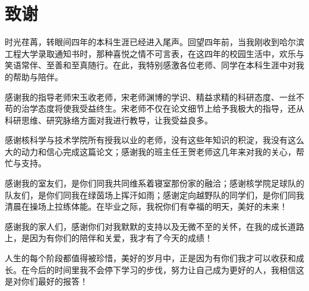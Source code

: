 \section*{致谢}
时光荏苒，转眼间四年的本科生涯已经进入尾声。回望四年前，当我刚收到哈尔滨工程大学录取通知书时，那种喜悦之情不可言表，在这四年的校园生活中，欢乐与笑语常伴、至善和至真随行。在此，我特别感激各位老师、同学在本科生涯中对我的帮助与陪伴。

感谢我的指导老师宋玉收老师，宋老师渊博的学识、精益求精的科研态度、一丝不苟的治学态度将使我受益终生。宋老师不仅在论文细节上给予我极大的指导，还从科研思维、研究脉络方面对我进行教导，让我受益良多。

感谢核科学与技术学院所有授我以业的老师，没有这些年知识的积淀，我没有这么大的动力和信心完成这篇论文；感谢我的班主任王贺老师这几年来对我的关心，帮忙与支持。

感谢我的室友们，是你们同我共同维系着寝室那份家的融洽；感谢核学院足球队的队友们，是你们同我在绿茵场上挥汗如雨；感谢定向越野队的同学们，是你们同我清晨在操场上拉练体能。在毕业之际，我祝你们有幸福的明天，美好的未来！

感谢我的家人们，感谢你们对我默默的支持以及无微不至的关怀，在我的成长道路上，是因为有你们的陪伴和关爱，我才有了今天的成绩！

人生的每个阶段都值得被珍惜，美好的岁月中，正是因为有你们我才可以收获和成长。在今后的时间里我不会停下学习的步伐，努力让自己成为更好的人，我相信这是对你们最好的报答！